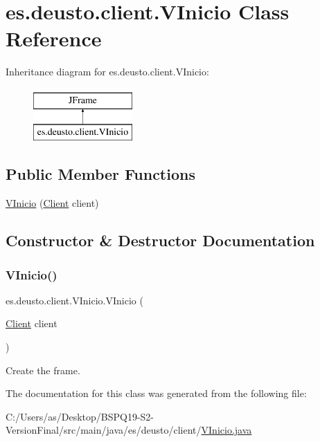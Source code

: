 \hypertarget{classes_1_1deusto_1_1client_1_1_v_inicio}{}\section{es.\+deusto.\+client.\+V\+Inicio Class Reference}
\label{classes_1_1deusto_1_1client_1_1_v_inicio}
Inheritance diagram for es.\+deusto.\+client.\+V\+Inicio\+:\begin{figure}[H]
\begin{center}
\leavevmode
\includegraphics[height=2.000000cm]{classes_1_1deusto_1_1client_1_1_v_inicio}
\end{center}
\end{figure}
\subsection*{Public Member Functions}
\begin{DoxyCompactItemize}
\item 
\mbox{\hyperlink{classes_1_1deusto_1_1client_1_1_v_inicio_afdd2ccc8ad54910cb71c90cd1e546bb7}{V\+Inicio}} (\mbox{\hyperlink{classes_1_1deusto_1_1client_1_1_client}{Client}} client)
\end{DoxyCompactItemize}


\subsection{Constructor \& Destructor Documentation}
\mbox{\label{classes_1_1deusto_1_1client_1_1_v_inicio_afdd2ccc8ad54910cb71c90cd1e546bb7}} 
\subsubsection{\texorpdfstring{VInicio()}{VInicio()}}
{\footnotesize\ttfamily es.\+deusto.\+client.\+V\+Inicio.\+V\+Inicio (\begin{DoxyParamCaption}\item[{\mbox{\hyperlink{classes_1_1deusto_1_1client_1_1_client}{Client}}}]{client }\end{DoxyParamCaption})}

Create the frame. 

The documentation for this class was generated from the following file\+:\begin{DoxyCompactItemize}
\item 
C\+:/\+Users/as/\+Desktop/\+B\+S\+P\+Q19-\/\+S2-\/\+Version\+Final/src/main/java/es/deusto/client/\mbox{\hyperlink{_v_inicio_8java}{V\+Inicio.\+java}}\end{DoxyCompactItemize}
